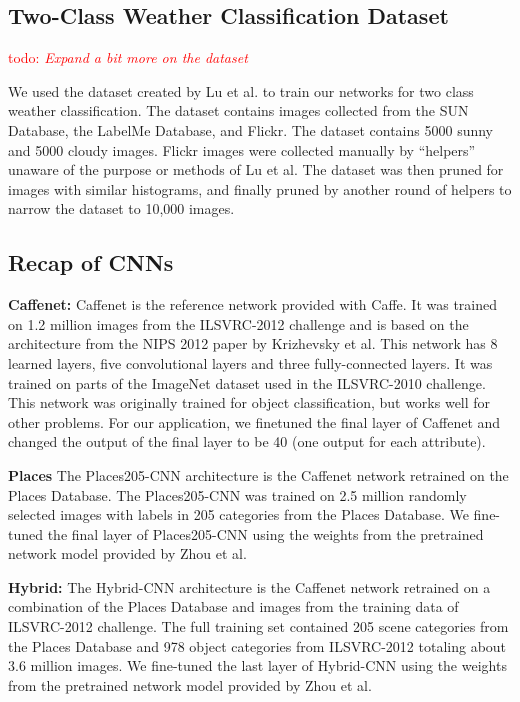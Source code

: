 \documentclass{article}
\newcommand{\todo}[1]{\textcolor{red}{todo: {\em #1}}}
\begin{document}
\subsection{Two-Class Weather Classification Dataset}
\todo{Expand a bit more on the dataset}
\indent

We used the dataset created by Lu\cite{lutwoclass} et al. to train our networks
for two class weather classification.  The dataset contains images collected from
the SUN Database\cite{xiaoSUN}, the LabelMe Database\cite{russell2008labelme}, and
Flickr. The dataset contains 5000 sunny and 5000 cloudy images. Flickr images were 
collected manually by ``helpers'' unaware of the purpose or methods of
Lu et al. The dataset was then pruned for images with similar
histograms, and finally pruned by another round of helpers to narrow
the dataset to 10,000 images. 

\subsection{Recap of CNNs}
\indent

\textbf{Caffenet:} Caffenet is the reference network provided with 
Caffe\cite{caffe14}.  It was trained on 1.2 million images from the 
ILSVRC-2012\cite{ILSVRCarxiv14} challenge and is based on the architecture from 
the NIPS 2012 paper by Krizhevsky\cite{caffenetnips12} et al.  This network has 
8 learned layers, five convolutional layers and three fully-connected layers.  
It was trained on parts of the ImageNet dataset used in the 
ILSVRC-2010\cite{ILSVRCarxiv14} challenge.  This network was originally trained 
for object classification, but works well for other problems. For our application, 
we finetuned the final layer of Caffenet and changed the output of the final 
layer to be 40 (one output for each attribute).

\textbf{Places} The Places205-CNN architecture is the Caffenet network retrained on 
the Places Database\cite{zhou2014places}.  The Places205-CNN was trained on 2.5
million randomly selected images with labels in 205 categories from the Places 
Database.  We fine-tuned the final layer of Places205-CNN using the weights from the
pretrained network model provided by Zhou\cite{zhou2014places} et al.

\textbf{Hybrid:} The Hybrid-CNN architecture is the Caffenet network retrained on
a combination of the Places Database\cite{zhou2014places} and images from the 
training data of ILSVRC-2012\cite{ILSVRCarxiv14} challenge.  The full training set
contained 205 scene categories from the Places Database and 978 object categories
from ILSVRC-2012 totaling about 3.6 million images.  We fine-tuned the last 
layer of Hybrid-CNN using the weights from the pretrained network model provided by 
Zhou\cite{zhou2014places} et al.
\end{document}
